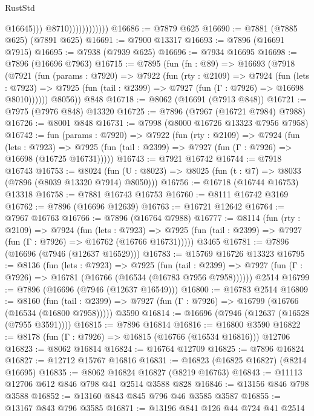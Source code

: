 \begin{lexlean}{RustStd}
\begin{coremodule}
                                  @16645)))
                            @8710))))))))))))
@16686 := @7879 @625
@16690 := @7881 (@7885 @625) (@7891 @625)
@16691 := @7900 @13317
@16693 := @7896 (@16691 @7915)
@16695 := @7938 (@7939 @625)
@16696 := @7934 @16695
@16698 := @7896 (@16696 @7963)
@16715 := @7895
    (fun (fn : @89) =>
    @16693
      (@7918
        (@7921
          (fun (params : @7920) =>
          @7922
            (fun (rty : @2109) =>
            @7924
              (fun (lets : @7923) =>
              @7925 (fun (tail : @2399) => @7927 (fun (Γ : @7926) => @16698 @8010))))))
        @8056))
    @848
@16718 := @8062 (@16691 (@7913 @848))
@16721 := @7975 (@7976 @848) @13320
@16725 := @7896 (@7967 (@16721 @7984) @7988)
@16726 := @8001 @848
@16731 := @7998 (@8000 @16726 @13323 @7956 @7958)
@16742 := fun (params : @7920) =>
  @7922
    (fun (rty : @2109) =>
    @7924
      (fun (lets : @7923) =>
      @7925 (fun (tail : @2399) => @7927 (fun (Γ : @7926) => @16698 (@16725 @16731)))))
@16743 := @7921 @16742
@16744 := @7918 @16743
@16753 := @8024
    (fun (U : @8023) => @8025 (fun (t : @7) => @8033 (@7896 (@8039 @13320 @7914) @8050)))
@16756 := @16718 (@16744 @16753) @13318
@16758 := @7881 @16743 @16753
@16760 := @8111 @16742 @3169
@16762 := @7896 (@16696 @12639)
@16763 := @16721 @12642
@16764 := @7967 @16763
@16766 := @7896 (@16764 @7988)
@16777 := @8114
    (fun (rty : @2109) =>
    @7924
      (fun (lets : @7923) =>
      @7925 (fun (tail : @2399) => @7927 (fun (Γ : @7926) => @16762 (@16766 @16731)))))
    @3465
@16781 := @7896 (@16696 (@7946 (@12637 @16529)))
@16783 := @15769 @16726 @13323
@16795 := @8136
    (fun (lets : @7923) =>
    @7925
      (fun (tail : @2399) =>
      @7927 (fun (Γ : @7926) => @16781 (@16766 (@16534 (@16783 @7956 @7958))))))
    @2514
@16799 := @7896 (@16696 (@7946 (@12637 @16549)))
@16800 := @16783 @2514
@16809 := @8160
    (fun (tail : @2399) => @7927 (fun (Γ : @7926) => @16799 (@16766 (@16534 (@16800 @7958)))))
    @3590
@16814 := @16696 (@7946 (@12637 (@16528 (@7955 @3591))))
@16815 := @7896 @16814
@16816 := @16800 @3590
@16822 := @8178 (fun (Γ : @7926) => @16815 (@16766 (@16534 @16816))) @12706
@16823 := @8062 @16814
@16824 := @16764 @12709
@16825 := @7896 @16824
@16827 := @12712 @15767 @16816
@16831 := @16823 (@16825 @16827) (@8214 @16695)
@16835 := @8062 @16824 @16827 (@8219 @16763)
@16843 := @11113 @12706 @612 @846 @798 @41 @2514 @3588 @828
@16846 := @13156 @846 @798 @3588
@16852 := @13160 @843 @845 @796 @46 @3585 @3587
@16855 := @13167 @843 @796 @3585
@16871 := @13196
    @841
    @126
    @44
    @724
    @41
    @2514

\end{coremodule}
\end{lexlean}
